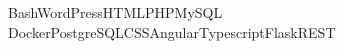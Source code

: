 Bash\spaced WordPress\spaced HTML\spaced PHP\spaced MySQL \spaced Docker\spaced PostgreSQL\spaced CSS\spaced Angular\spaced Typescript\spaced Flask\spaced REST\,